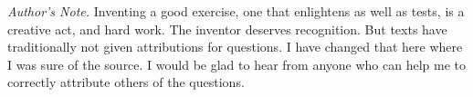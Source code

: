 {\vspace{3ex plus 1fill}
\par\noindent\textit{Author's Note.}
Inventing a good exercise, one that enlightens as well as tests, 
is a creative act, and hard work.
The inventor deserves recognition.
But texts have traditionally not given attributions for
questions.
I have changed that here where I was sure of the source.
I would be glad to hear from anyone who can help me to correctly
attribute others of the questions.   
} %
